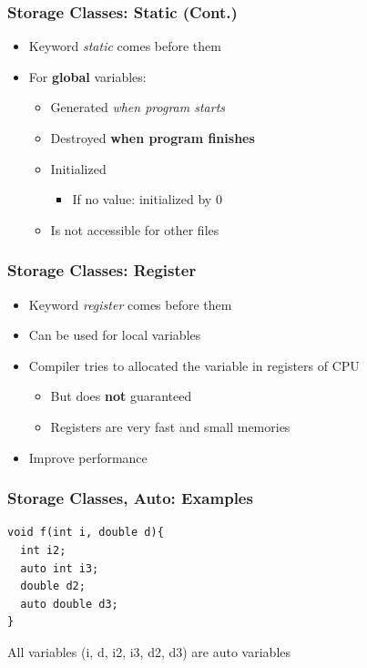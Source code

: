 \documentclass{../c-lecture}
\begin{document}
\begin{frame}
  \frametitle{Storage Classes: Static (Cont.)}
  \begin{itemize}
    \item Keyword \textit{\color{YellowOrange} static} comes before them
    \item For \textbf{\color{Goldenrod} global} variables:
    \begin{itemize}
      \item Generated \textit{\color{Purple} when program starts}
      \item Destroyed \textbf{\color{Cyan} when program finishes}
      \item Initialized
      \begin{itemize}
        \item If no value: initialized by 0
      \end{itemize}
      \item Is not accessible for other files
    \end{itemize}
  \end{itemize}
\end{frame}

\begin{frame}
  \frametitle{Storage Classes: Register}
  \begin{itemize}
    \item Keyword \textit{\color{Orange} register} comes before them
    \item Can be used for local variables
    \item Compiler tries to allocated the variable in registers of CPU
    \begin{itemize}
      \item But does \textbf{\color{RubineRed} not} guaranteed
      \item Registers are very fast and small memories
    \end{itemize}
    \item Improve performance
  \end{itemize}
\end{frame}

\begin{frame}[fragile]
  \frametitle{Storage Classes, Auto: Examples}
  \scriptsize
  \begin{verbatim}
void f(int i, double d){
  int i2;
  auto int i3;
  double d2;
  auto double d3;
}
  \end{verbatim}
  \begin{block}{}
    All variables (i, d, i2, i3, d2, d3) are auto variables
  \end{block}
\end{frame}
\end{document}
